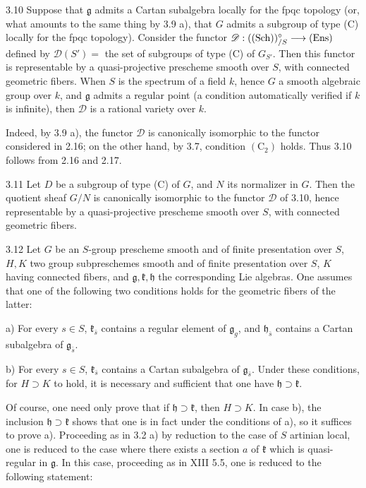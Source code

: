 \begin{corollary}{3.10}\label{XIV.3.10}
Suppose that $\mathfrak g$ admits a Cartan subalgebra locally
for the fpqc topology (or, what amounts to the same thing by
3.9 a), that $G$ admits a subgroup of type (C) locally for the
fpqc topology). Consider the functor
$\mathscr D:(\textup{(Sch)})^\circ_{/S}\longrightarrow\textup{(Ens)}$ defined by
$\mathscr D(S')=$ the set of subgroups of type (C) of $G_{S'}$.
Then this functor is representable by a quasi-projective prescheme
smooth over $S$, with connected geometric fibers. When $S$ is
the spectrum of a field $k$, hence $G$ a smooth algebraic group
over $k$, and $\mathfrak g$ admits a regular point (a condition
automatically verified if $k$ is infinite), then $\mathscr D$ is
a rational variety over $k$.
\end{corollary}
Indeed, by 3.9 a), the functor $\mathscr D$ is canonically
isomorphic to the functor considered in 2.16; on the other hand,
by 3.7, condition $(\mathrm C_2)$ holds. Thus 3.10 follows from
2.16 and 2.17.

\begin{corollary}{3.11}\label{XIV.3.11}
Let $D$ be a subgroup of type (C) of $G$, and $N$ its normalizer
in $G$. Then the quotient sheaf $G/N$ is canonically isomorphic
to the functor $\mathscr D$ of 3.10, hence representable by a
quasi-projective prescheme smooth over $S$, with connected
geometric fibers.
\end{corollary}

\begin{proposition}{3.12}\label{XIV.3.12}
Let $G$ be an $S$-group prescheme smooth and of finite
presentation over $S$, $H,K$ two group subpreschemes smooth
and of finite presentation over $S$, $K$ having connected
fibers, and $\mathfrak g,\mathfrak k,\mathfrak h$ the corresponding
Lie algebras. One assumes that one of the following two
conditions holds for the geometric fibers of the latter:

\noindent a) For every $s\in S$, $\mathfrak k_{\bar s}$ contains
a regular element of $\mathfrak g_g$, and $\mathfrak h_{\bar s}$
contains a Cartan subalgebra of $\mathfrak g_{\bar s}$.

\noindent b) For every $s\in S$, $\mathfrak k_{\bar s}$ contains
a Cartan subalgebra of $\mathfrak g_{\bar s}$. Under these
conditions, for $H\supset K$ to hold, it is necessary and
sufficient that one have $\mathfrak h\supset\mathfrak k$.
\end{proposition}
Of course, one need only prove that if
$\mathfrak h\supset\mathfrak k$, then $H\supset K$.
In case b), the inclusion $\mathfrak h\supset\mathfrak k$
shows that one is in fact under the conditions of a),
so it suffices to prove a). Proceeding as in 3.2 a)
by reduction to the case of $S$ artinian local, one
is reduced to the case where there exists a section
$a$ of $\mathfrak k$ which is quasi-regular in
$\mathfrak g$. In this case, proceeding as in XIII
5.5, one is reduced to the following statement:


